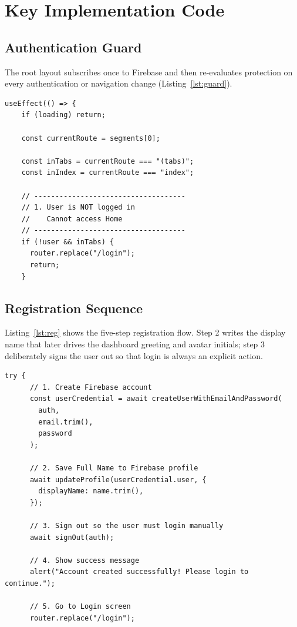 \documentclass[12pt,a4paper,oneside]{report}
\begin{document}
\section{Key Implementation Code}

\subsection{Authentication Guard}
The root layout subscribes once to Firebase and then re-evaluates protection on every
authentication or navigation change (Listing~\ref{lst:guard}).

\begin{lstlisting}[caption={Route protection in app/\_layout.tsx, lines 41--56}, label={lst:guard}]
  useEffect(() => {
    if (loading) return;

    const currentRoute = segments[0];

    const inTabs = currentRoute === "(tabs)";
    const inIndex = currentRoute === "index";

    // ------------------------------------
    // 1. User is NOT logged in
    //    Cannot access Home
    // ------------------------------------
    if (!user && inTabs) {
      router.replace("/login");
      return;
    }
\end{lstlisting}

\subsection{Registration Sequence}
Listing~\ref{lst:reg} shows the five-step registration flow. Step 2 writes the
display name that later drives the dashboard greeting and avatar initials; step 3
deliberately signs the user out so that login is always an explicit action.

\begin{lstlisting}[caption={Registration flow in app/register.tsx, lines 80--100}, label={lst:reg}]
    try {
      // 1. Create Firebase account
      const userCredential = await createUserWithEmailAndPassword(
        auth,
        email.trim(),
        password
      );

      // 2. Save Full Name to Firebase profile
      await updateProfile(userCredential.user, {
        displayName: name.trim(),
      });

      // 3. Sign out so the user must login manually
      await signOut(auth);

      // 4. Show success message
      alert("Account created successfully! Please login to continue.");

      // 5. Go to Login screen
      router.replace("/login");
\end{lstlisting}
\end{document}
